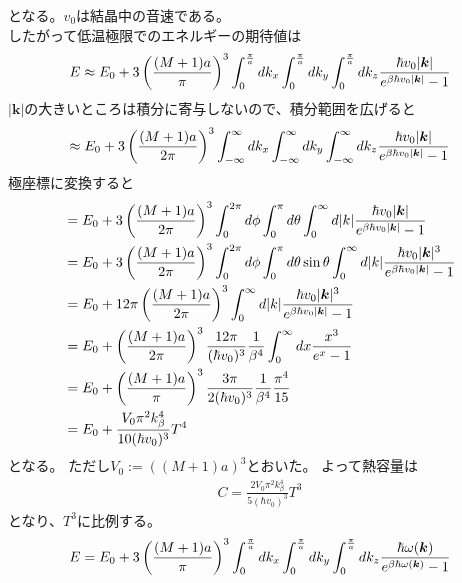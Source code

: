 \documentclass[dvipdfmx, 11pt, a4paper]{jsarticle}
\theoremstyle{definition}
\begin{document}
    となる。$v_0$は結晶中の音速である。\\
    したがって低温極限でのエネルギーの期待値は
    \begin{align}
        E \approx E_0 + 3\left( \frac{(M+1)a}{\pi} \right)^3 \int_0^{\frac{\pi}{a}} dk_x \int_0^{\frac{\pi}{a}} dk_y \int_0^{\frac{\pi}{a}} dk_z \frac{\hbar  v_0 |\bm{k}| }{ e^{\beta \hbar  v_0 |\bm{k}|} - 1} \notag 
    \end{align}
    $|\bm{k}|$の大きいところは積分に寄与しないので、積分範囲を広げると
    \begin{align}
        \approx E_0 + 3\left( \frac{(M+1)a}{2\pi} \right)^3 \int_{-\infty}^{\infty} dk_x \int_{-\infty}^{\infty} dk_y \int_{-\infty}^{\infty} dk_z \frac{\hbar  v_0 |\bm{k}| }{ e^{\beta \hbar  v_0 |\bm{k}|} - 1} \notag 
    \end{align}
    極座標に変換すると
    \begin{align}
        &= E_0 + 3\left( \frac{(M+1)a}{2\pi} \right)^3 \int_0^{2\pi} d\phi \int_0^{\pi} d\theta \int_0^{\infty} d|k| \frac{\hbar  v_0 |\bm{k}| }{ e^{\beta \hbar  v_0 |\bm{k}|} - 1} \notag \\
        &= E_0 + 3\left( \frac{(M+1)a}{2\pi} \right)^3 \int_0^{2\pi} d\phi \int_0^{\pi} d\theta \sin \theta \int_0^{\infty} d|k| \frac{\hbar  v_0 |\bm{k}|^3 }{ e^{\beta \hbar  v_0 |\bm{k}|} - 1} \notag \\
        &=E_0 + 12\pi \left( \frac{(M+1)a}{2\pi} \right)^3 \int_0^{\infty} d|k| \frac{\hbar  v_0 |\bm{k}|^3 }{ e^{\beta \hbar  v_0 |\bm{k}|} - 1} \notag \\
        &=E_0 + \left( \frac{(M+1)a}{2\pi} \right)^3  \frac{12\pi}{(\hbar v_0)^3} \frac{1}{\beta^4} \int_0^{\infty} dx \frac{x^3 }{ e^{x} - 1} \notag \\
        &=E_0 + \left( \frac{(M+1)a}{\pi} \right)^3  \frac{3\pi}{2(\hbar v_0)^3} \frac{1}{\beta^4} \frac{\pi^4}{15} \notag \\
        &=E_0 + \frac{V_0 \pi^2 k_\beta^4}{10(\hbar v_0)^3} T^4  
    \end{align}
    となる。
    ただし$V_0 := \left( {(M+1)a} \right)^3 $とおいた。
    よって熱容量は
    \begin{align}
        C = \frac{2V_0 \pi^2 k_\beta^4}{5(\hbar v_0)^3} T^3  
    \end{align}
    となり、$T^3$に比例する。\\
    \begin{align}
        E =  E_0 + 3\left( \frac{(M+1)a}{\pi} \right)^3 \int_0^{\frac{\pi}{a}} dk_x \int_0^{\frac{\pi}{a}} dk_y \int_0^{\frac{\pi}{a}} dk_z \frac{\hbar \omega (\bm{k})}{ e^{\beta \hbar \omega (\bm{k})} - 1} \notag 
    \end{align}
\end{document}
